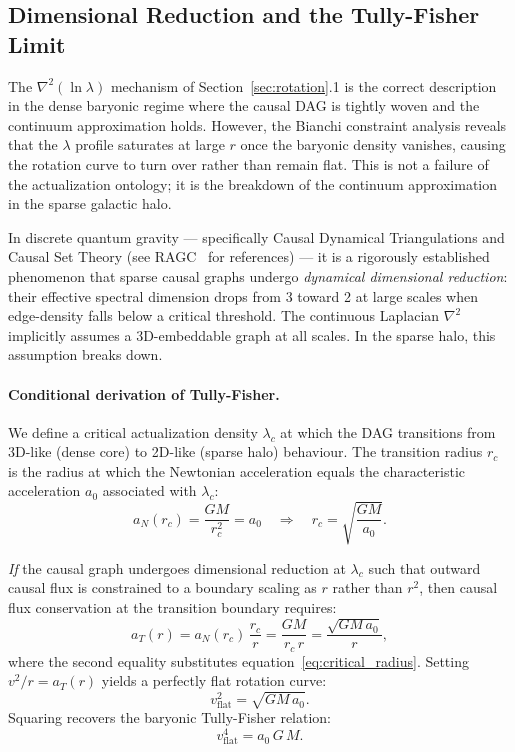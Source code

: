 \documentclass[11pt,a4paper]{article}
\theoremstyle{plain}
\theoremstyle{definition}
\theoremstyle{remark}
\begin{document}
\subsection{Dimensional Reduction and the Tully-Fisher Limit}
\label{sec:dimensional_reduction}

The $\nabla^2(\ln\lambda)$ mechanism of Section~\ref{sec:rotation}.1 is the
correct description in the dense baryonic regime where the causal DAG is
tightly woven and the continuum approximation holds. However, the Bianchi
constraint analysis reveals that the $\lambda$ profile saturates at large $r$
once the baryonic density vanishes, causing the rotation curve to turn over
rather than remain flat. This is not a failure of the actualization ontology;
it is the breakdown of the continuum approximation in the sparse galactic halo.

In discrete quantum gravity --- specifically Causal Dynamical
Triangulations and Causal Set Theory (see RAGC~\citep{Sandeman2026b} for references) ---
it is a rigorously established phenomenon that sparse causal graphs undergo
\emph{dynamical dimensional reduction}: their effective spectral dimension drops
from 3 toward 2 at large scales when edge-density falls below a critical
threshold. The continuous Laplacian $\nabla^2$ implicitly assumes a 3D-embeddable
graph at all scales. In the sparse halo, this assumption breaks down.

\paragraph{Conditional derivation of Tully-Fisher.}
We define a critical actualization density $\lambda_c$ at which the DAG
transitions from 3D-like (dense core) to 2D-like (sparse halo) behaviour.
The transition radius $r_c$ is the radius at which the Newtonian acceleration
equals the characteristic acceleration $a_0$ associated with $\lambda_c$:
\begin{equation}
  a_N(r_c) = \frac{GM}{r_c^2} = a_0
  \quad\Longrightarrow\quad
  r_c = \sqrt{\frac{GM}{a_0}}.
  \label{eq:critical_radius}
\end{equation}

\textit{If} the causal graph undergoes dimensional reduction at $\lambda_c$
such that outward causal flux is constrained to a boundary scaling as $r$
rather than $r^2$, then causal flux conservation at the transition boundary
requires:
\begin{equation}
  a_T(r) = a_N(r_c)\,\frac{r_c}{r}
           = \frac{GM}{r_c\,r}
           = \frac{\sqrt{GM\,a_0}}{r},
  \label{eq:halo_accel}
\end{equation}
where the second equality substitutes equation~\eqref{eq:critical_radius}.
Setting $v^2/r = a_T(r)$ yields a perfectly flat rotation curve:
\begin{equation}
  v_{\mathrm{flat}}^2 = \sqrt{GM\,a_0}.
  \label{eq:tully_fisher}
\end{equation}
Squaring recovers the baryonic Tully-Fisher relation:
\begin{equation}
  v_{\mathrm{flat}}^4 = a_0\,G\,M.
  \label{eq:tully_fisher_derived}
\end{equation}
\end{document}
